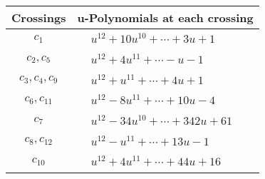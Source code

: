 \documentclass[1p]{elsarticle_modified}
\theoremstyle{definition}
\begin{document}
\begin{tabular}{m{50pt}|m{274pt}}
Crossings & \hspace{64pt}u-Polynomials at each crossing \\
\hline $$\begin{aligned}c_{1}\end{aligned}$$&$\begin{aligned}
&u^{12}+10 u^{10}+\cdots+3 u+1
\end{aligned}$\\
\hline $$\begin{aligned}c_{2},c_{5}\end{aligned}$$&$\begin{aligned}
&u^{12}+4 u^{11}+\cdots- u-1
\end{aligned}$\\
\hline $$\begin{aligned}c_{3},c_{4},c_{9}\end{aligned}$$&$\begin{aligned}
&u^{12}+u^{11}+\cdots+4 u+1
\end{aligned}$\\
\hline $$\begin{aligned}c_{6},c_{11}\end{aligned}$$&$\begin{aligned}
&u^{12}-8 u^{11}+\cdots+10 u-4
\end{aligned}$\\
\hline $$\begin{aligned}c_{7}\end{aligned}$$&$\begin{aligned}
&u^{12}-34 u^{10}+\cdots+342 u+61
\end{aligned}$\\
\hline $$\begin{aligned}c_{8},c_{12}\end{aligned}$$&$\begin{aligned}
&u^{12}- u^{11}+\cdots+13 u-1
\end{aligned}$\\
\hline $$\begin{aligned}c_{10}\end{aligned}$$&$\begin{aligned}
&u^{12}+4 u^{11}+\cdots+44 u+16
\end{aligned}$\\
\hline
\end{tabular}\\~\\
\newpage\renewcommand{\arraystretch}{1}
\end{document}
